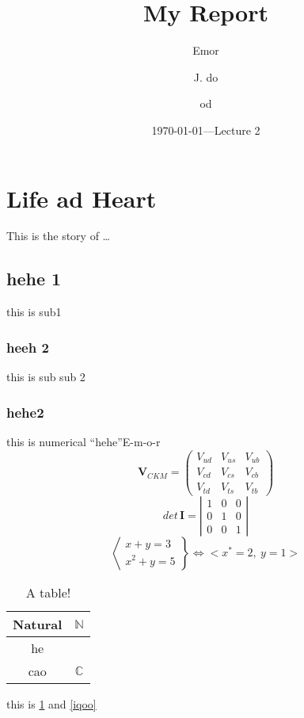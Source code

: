 \documentclass[10pt,a4papper,utf8]{article}
\title{My Report}
\author{Emor \and J. do \and od}
\date{\today---Lecture 2}
\begin{document}
\maketitle
\newpage
\tableofcontents
\newpage

\section{Life ad Heart}
This is the story of \ldots
\subsection{hehe 1}
this is sub1
\subsubsection*{heeh 2}
this is sub sub 2
\subsubsection{hehe2}
this is numerical ``hehe''E-m-o-r
\newline
\begin{equation}
    \mathbf{V}_{CKM} = \left(
    \begin{array}{ccc}
            V_{ud} & V_{us} & V_{ub} \\V_{cd} & V_{cs} & V_{cb}\\
            V_{td} & V_{ts} & V_{tb}\end{array}\right)
\end{equation}
\begin{equation}\label{iqoo}
    det \,\mathbf{I} = \left| \begin{array}{ccc}
        1 & 0 & 0 \\0&1&0\\0&0&1
    \end{array}
    \right\vert
\end{equation}
\begin{equation}
    \left<
    \begin{array}{c}
        x+y=3 \\
        x^2+y=5
    \end{array}\right\}\Leftrightarrow <x^*=2,~y=1>
\end{equation}
\newpage
\begin{table}
    \centering
    \begin{tabular}{c|c}
        \hline
        Natural & $\mathbb{N}$ \\
        \hline
        he                     \\
        \hline
        cao     & $\mathbb{C}$ \\
        \hline
    \end{tabular}
    \caption{\label{labelfk}A table!}
\end{table}
this is \ref{labelfk} and \eqref{iqoo}

\cite{Ong2015}\cite{Hasselt2015}
{}

\end{document}
